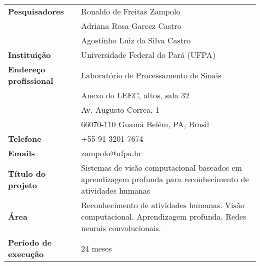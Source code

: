 \begin{table}[!th]
\begin{tabular}{|l p{}|}
\hline
\textbf{Pesquisadores}        & Ronaldo de Freitas Zampolo \\
			      & Adriana Rosa Garcez Castro\\
			      & Agostinho Luiz da Silva Castro\\
\textbf{Instituição}          & Universidade Federal do Pará (UFPA)\\
\textbf{Endereço profissional}& Laboratório de Processamento de Sinais\\
                              & Anexo do LEEC, altos, sala 32\\
                              & Av. Augusto Correa, 1\\
                              & 66070-110 Guamá Belém, PA, Brasil\\
\textbf{Telefone}             & +55 91 3201-7674 \\
\textbf{Emails}               & zampolo@ufpa.br\\
\textbf{Título do projeto}    & Sistemas de visão computacional baseados em aprendizagem profunda para reconhecimento de atividades humanas\\
\textbf{Área}                 & Reconhecimento de atividades humanas. Visão computacional. Aprendizagem profunda. Redes neurais convolucionais.\\
\textbf{Período de execução}  & 24 meses\\
\hline
\end{tabular}
\end{table}
